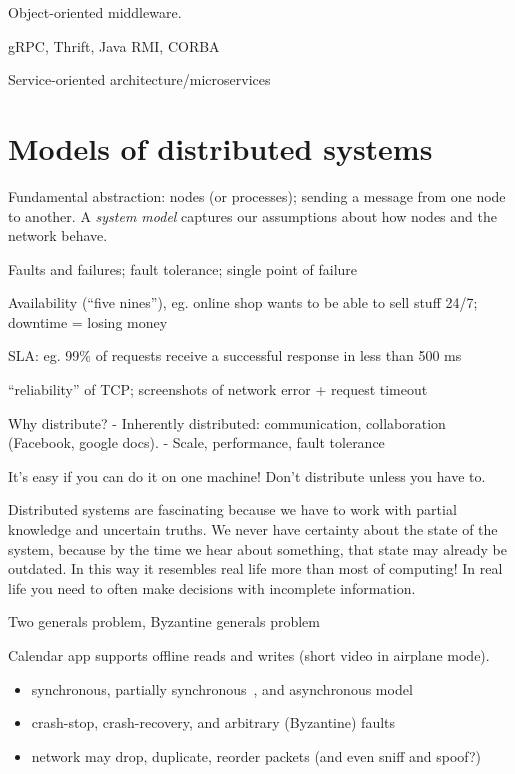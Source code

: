 Object-oriented middleware.

gRPC, Thrift, Java RMI, CORBA


Service-oriented architecture/microservices

\section{Models of distributed systems}

Fundamental abstraction: nodes (or processes); sending a message from one node to another.
A \emph{system model} captures our assumptions about how nodes and the network behave.

Faults and failures; fault tolerance; single point of failure

Availability (``five nines''), eg. online shop wants to be able to sell stuff 24/7; downtime = losing money

SLA: eg. 99\% of requests receive a successful response in less than 500 ms

``reliability'' of TCP; screenshots of network error + request timeout

Why distribute?
- Inherently distributed: communication, collaboration (Facebook, google docs).
- Scale, performance, fault tolerance

It's easy if you can do it on one machine! Don't distribute unless you have to. 

Distributed systems are fascinating because we have to work with partial knowledge and uncertain
truths. We never have certainty about the state of the system, because by the time we hear about
something, that state may already be outdated. In this way it resembles real life more than most of
computing! In real life you need to often make decisions with incomplete information.

Two generals problem, Byzantine generals problem


Calendar app supports offline reads and writes (short video in airplane mode).

\begin{itemize}
\item synchronous, partially synchronous~\cite{Dwork:1988dr}, and asynchronous model
\item crash-stop, crash-recovery, and arbitrary (Byzantine) faults
\item network may drop, duplicate, reorder packets (and even sniff and spoof?)
\end{itemize}

